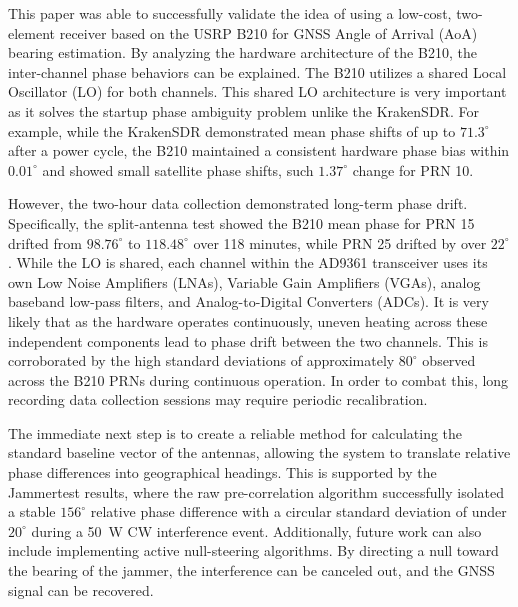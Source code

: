 \documentclass[conference]{IEEEtran}
\begin{document}
This paper was able to successfully validate the idea of using a low-cost, two-element receiver based on the USRP B210 for GNSS Angle of Arrival (AoA) bearing estimation. By analyzing the hardware architecture of the B210, the inter-channel phase behaviors can be explained. The B210 utilizes a shared Local Oscillator (LO) for both channels. This shared LO architecture is very important as it solves the startup phase ambiguity problem unlike the KrakenSDR. For example, while the KrakenSDR demonstrated mean phase shifts of up to $71.3^\circ$ after a power cycle, the B210 maintained a consistent hardware phase bias within $0.01^\circ$ and showed small satellite phase shifts, such $1.37^\circ$ change for PRN 10.

However, the two-hour data collection demonstrated long-term phase drift. Specifically, the split-antenna test showed the B210 mean phase for PRN 15 drifted from $98.76^\circ$ to $118.48^\circ$ over 118 minutes, while PRN 25 drifted by over $22^\circ$. While the LO is shared, each channel within the AD9361 transceiver uses its own Low Noise Amplifiers (LNAs), Variable Gain Amplifiers (VGAs), analog baseband low-pass filters, and Analog-to-Digital Converters (ADCs). It is very likely that as the hardware operates continuously, uneven heating across these independent components lead to phase drift between the two channels. This is corroborated by the high standard deviations of approximately $80^\circ$ observed across the B210 PRNs during continuous operation. In order to combat this, long recording data collection sessions may require periodic recalibration.

The immediate next step is to create a reliable method for calculating the standard baseline vector of the antennas, allowing the system to translate relative phase differences into geographical headings. This is supported by the Jammertest results, where the raw pre-correlation algorithm successfully isolated a stable $156^\circ$ relative phase difference with a circular standard deviation of under $20^\circ$ during a 50~W CW interference event. Additionally, future work can also include implementing active null-steering algorithms. By directing a null toward the bearing of the jammer, the interference can be canceled out, and the GNSS signal can be recovered.



\end{document}
